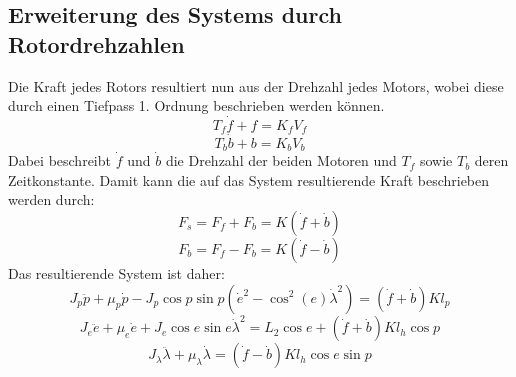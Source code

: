 \documentclass{article}
\begin{document}
\subsection{Erweiterung des Systems durch Rotordrehzahlen}
Die Kraft jedes Rotors resultiert nun aus der Drehzahl jedes Motors, wobei diese durch einen Tiefpass 1. Ordnung beschrieben werden können.
\begin{equation}
T_f \dot{f} + f = K_f V_f
\end{equation}
\begin{equation}
T_b \dot{b} + b = K_b V_b
\end{equation}
Dabei beschreibt $\dot{f}$ und $\dot{b}$ die Drehzahl der beiden Motoren und $T_f$ sowie $T_b$ deren Zeitkonstante.
Damit kann die auf das System resultierende Kraft beschrieben werden durch:
\begin{equation}
F_s = F_f + F_b = K (\dot{f} + \dot{b})
\end{equation}
\begin{equation}
F_b = F_f - F_b = K (\dot{f} - \dot{b})
\end{equation}
Das resultierende System ist daher:
\begin{equation}
J_p \ddot{p} + \mu_p \dot{p} - J_p \cos p \sin p (\dot{e}^2- \cos^2 (e) \dot{\lambda}^2) = (\dot{f} + \dot{b}) K l_p
\end{equation}
\begin{equation}
J_e\ddot{e} + \mu_e \dot{e} + J_e \cos e \sin e \dot{\lambda}^2 
= L_2 \cos e + (\dot{f} + \dot{b}) K l_h \cos p
\end{equation}
\begin{equation}
J_\lambda \ddot{\lambda} + \mu_\lambda \dot{\lambda} = (\dot{f} - \dot{b}) K l_h \cos e \sin p
\end{equation}
\end{document}
